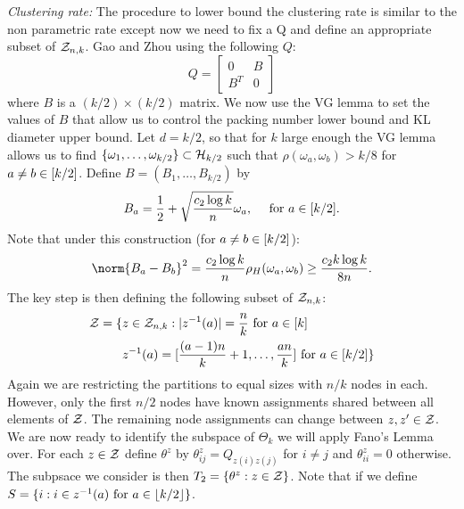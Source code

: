 \documentclass[11pt]{article}
\begin{document}
\textit{Clustering rate:} The procedure to lower bound the clustering rate is similar to the non parametric rate except now we need to fix a Q and define an appropriate subset of $\mathcal{Z}_{n,k}$. Gao and Zhou using the following $Q$:
\begin{equation}
Q = \left[
\begin{array}{cc}
0 & B \\
B^T & 0
\end{array}
\right]
\end{equation}
where $B$ is a $(k/2) \times (k/2)$ matrix. We now use the VG lemma to set the values of $B$ that allow us to control the packing number lower bound and KL diameter upper bound. Let $d = k/2$, so that for $k$ large enough the VG lemma allows us to find $\{\omega_1, \dots, \omega_{k/2}\} \subset \mathcal{H}_{k/2}$ such that $\rho(\omega_a, \omega_b) > k/8$ for $a \neq b \in \lbrack k/2\rbrack$. Define $B = (B_1, \dots, B_{k/2})$ by
\begin{equation}
B_a = \frac{1}{2} + \sqrt{\frac{c_2 \log k}{n}}\omega_a, \quad \text{ for } a \in \lbrack k/2\rbrack.
\end{equation}
Note that under this construction (for $a \neq b \in \lbrack k/2\rbrack$):
\begin{equation}
\norm{B_a - B_b}^2 = \frac{c_2 \log k}{n} \rho_H(\omega_a, \omega_b) \geq \frac{c_2 k \log k}{8 n}.
\end{equation}
The key step is then defining the following subset of $\mathcal{Z}_{n,k}$:
\begin{equation}
\begin{aligned}
\mathcal{Z} = \{&z \in \mathcal{Z}_{n,k} : |z^{-1}(a)| = \frac{n}{k} \text{ for } a \in \lbrack k\rbrack \\
          &z^{-1}(a) = \lbrack\frac{(a-1)n}{k} + 1, \dots, \frac{an}{k}\rbrack \text{ for } a \in \lbrack k/2\rbrack\}
\end{aligned}
\end{equation}
Again we are restricting the partitions to equal sizes with $n/k$ nodes in each. However, only the first $n/2$ nodes have known assignments shared between all elements of $\mathcal{Z}$. The remaining node assignments can change between $z, z' \in \mathcal{Z}$. We are now ready to identify the subspace of $\Theta_k$ we will apply Fano's Lemma over. For each $z \in \mathcal{Z}$ define $\theta^{z}$ by $\theta_{ij}^z = Q_{z(i)z(j)}$ for $i \neq j$ and $\theta_{ii}^z = 0$ otherwise. The subpsace we consider is then $T_2 = \{\theta^{z} : z \in \mathcal{Z}\}$. Note that if we define $S = \{i : i \in z^{-1}(a) \text{ for } a \in \lfloor k/2\rfloor\}$.
\end{document}
